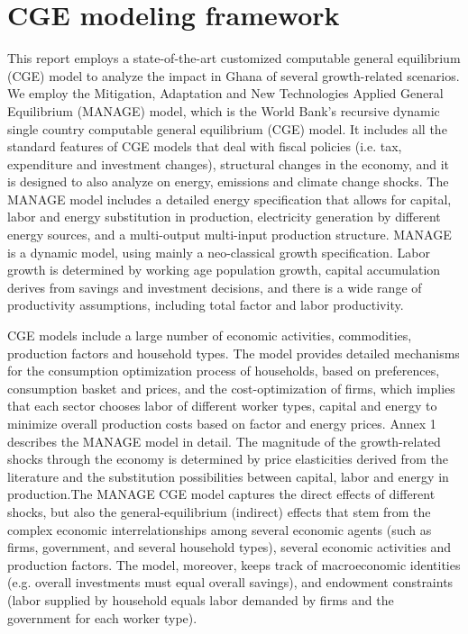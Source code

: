 \documentclass[11pt,english]{article}
\begin{document}
\section{CGE modeling framework}

This report employs a state-of-the-art customized computable general equilibrium (CGE) model to analyze the impact in Ghana of several growth-related scenarios. We employ the Mitigation, Adaptation and New Technologies Applied General Equilibrium (MANAGE) model, which is the World Bank's recursive dynamic single country computable general equilibrium (CGE) model. It includes all the standard features of CGE models that deal with fiscal policies (i.e. tax, expenditure and investment changes), structural changes in the economy, and it is designed to also analyze on energy, emissions and climate change shocks. The MANAGE model includes a detailed energy specification that allows for capital, labor and energy substitution in production, electricity generation by different energy sources, and a multi-output multi-input production structure. MANAGE is a dynamic model, using mainly a neo-classical growth specification. Labor growth is determined by working age population growth, capital accumulation derives from savings and investment decisions, and there is a wide range of productivity assumptions, including total factor and labor productivity. 

CGE models include a large number of economic activities, commodities, production factors and household types. The model provides detailed mechanisms for the consumption optimization process of households, based on preferences, consumption basket and prices, and the cost-optimization of firms, which implies that each sector chooses labor of different worker types, capital and energy to minimize overall production costs based on factor and energy prices. Annex 1 describes the MANAGE model in detail. The magnitude of the growth-related shocks through the economy is determined by price elasticities derived from the literature and the substitution possibilities between capital, labor and energy in production.The MANAGE CGE model captures the direct effects of different shocks, but also the general-equilibrium (indirect) effects that stem from the complex economic interrelationships among several economic agents (such as firms, government, and several household types), several economic activities and production factors. The model,  moreover, keeps track of macroeconomic identities (e.g. overall investments must equal overall savings), and endowment constraints (labor supplied by household equals labor demanded by firms and the government for each worker type). 
\end{document}
